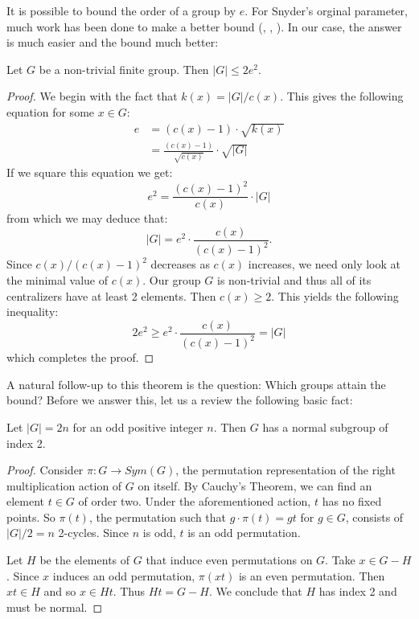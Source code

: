 \documentclass[main.tex]{subfiles}
\begin{document}
It is possible to bound the order of a group by $e$. For Snyder's orginal parameter, much work has been done to make a better bound (\cite{isaacsarticle}, \cite{durfeejensenarticle}, \cite{lewisarticle}). In our case, the answer is much easier and the bound much better:

\begin{theorem}\label{ebound}
Let $G$ be a non-trivial finite group. Then $|G| \le 2e^2$.
\end{theorem}

\begin{proof}
We begin with the fact that $k(x) = |G|/c(x)$. This gives the following equation for some $x \in G$:
\begin{align*}
e &= (c(x) - 1) \cdot \sqrt{k(x)} \\
&= \frac{(c(x) - 1)}{\sqrt{c(x)}} \cdot \sqrt{|G|}
\end{align*}
If we square this equation we get:
$$e^2 = \frac{(c(x) - 1)^2}{c(x)} \cdot |G|$$
from which we may deduce that:
$$|G| = e^2 \cdot \frac{c(x)}{(c(x) -1)^2}\text{.}$$
Since $c(x)/(c(x) - 1)^2$ decreases as $c(x)$ increases, we need only look at the minimal value of $c(x)$. Our group $G$ is non-trivial and thus all of its centralizers have at least 2 elements. Then $c(x) \ge 2$. This yields the following inequality:
$$2e^2 \ge e^2 \cdot \frac{c(x)}{(c(x) - 1)^2} = |G|$$
which completes the proof.
\end{proof}

A natural follow-up to this theorem is the question: Which groups attain the bound? Before we answer this, let us a review the following basic fact:

\begin{lemma}\label{ordernormal}
Let $|G| = 2n$ for an odd positive integer $n$. Then $G$ has a normal subgroup of index 2. 
\end{lemma}

\begin{proof}
Consider $\pi: G \to Sym(G)$, the permutation representation of the right multiplication action of $G$ on itself. By Cauchy's Theorem, we can find an element $t \in G$ of order two. Under the aforementioned action, $t$ has no fixed points. So $\pi(t)$, the permutation such that $g \cdot \pi(t) = gt$ for $g \in G$, consists of $|G|/2 = n$ 2-cycles. Since $n$ is odd, $t$ is an odd permutation.

Let $H$ be the elements of $G$ that induce even permutations on $G$. Take $x \in G - H$. Since $x$ induces an odd permutation, $\pi(xt)$ is an even permutation. Then $xt \in H$ and so $x \in Ht$. Thus $Ht = G- H$. We conclude that $H$ has index 2 and must be normal.
\end{proof}
\end{document}
